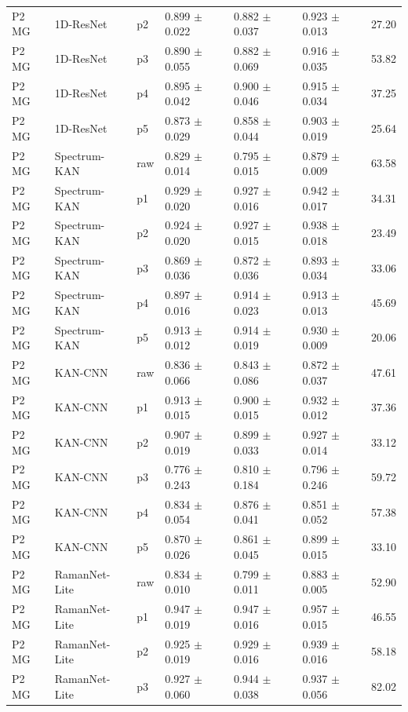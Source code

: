 {\begin{longtable}{L{2.35cm}L{2.4cm}L{1.0cm}L{2.35cm}L{2.25cm}L{2.25cm}L{1.45cm}}
P2 MG & 1D-ResNet & p2 & 0.899 $\pm$ 0.022 & 0.882 $\pm$ 0.037 & 0.923 $\pm$ 0.013 & 27.20 \\
P2 MG & 1D-ResNet & p3 & 0.890 $\pm$ 0.055 & 0.882 $\pm$ 0.069 & 0.916 $\pm$ 0.035 & 53.82 \\
P2 MG & 1D-ResNet & p4 & 0.895 $\pm$ 0.042 & 0.900 $\pm$ 0.046 & 0.915 $\pm$ 0.034 & 37.25 \\
P2 MG & 1D-ResNet & p5 & 0.873 $\pm$ 0.029 & 0.858 $\pm$ 0.044 & 0.903 $\pm$ 0.019 & 25.64 \\
P2 MG & Spectrum-KAN & raw & 0.829 $\pm$ 0.014 & 0.795 $\pm$ 0.015 & 0.879 $\pm$ 0.009 & 63.58 \\
P2 MG & Spectrum-KAN & p1 & 0.929 $\pm$ 0.020 & 0.927 $\pm$ 0.016 & 0.942 $\pm$ 0.017 & 34.31 \\
P2 MG & Spectrum-KAN & p2 & 0.924 $\pm$ 0.020 & 0.927 $\pm$ 0.015 & 0.938 $\pm$ 0.018 & 23.49 \\
P2 MG & Spectrum-KAN & p3 & 0.869 $\pm$ 0.036 & 0.872 $\pm$ 0.036 & 0.893 $\pm$ 0.034 & 33.06 \\
P2 MG & Spectrum-KAN & p4 & 0.897 $\pm$ 0.016 & 0.914 $\pm$ 0.023 & 0.913 $\pm$ 0.013 & 45.69 \\
P2 MG & Spectrum-KAN & p5 & 0.913 $\pm$ 0.012 & 0.914 $\pm$ 0.019 & 0.930 $\pm$ 0.009 & 20.06 \\
P2 MG & KAN-CNN & raw & 0.836 $\pm$ 0.066 & 0.843 $\pm$ 0.086 & 0.872 $\pm$ 0.037 & 47.61 \\
P2 MG & KAN-CNN & p1 & 0.913 $\pm$ 0.015 & 0.900 $\pm$ 0.015 & 0.932 $\pm$ 0.012 & 37.36 \\
P2 MG & KAN-CNN & p2 & 0.907 $\pm$ 0.019 & 0.899 $\pm$ 0.033 & 0.927 $\pm$ 0.014 & 33.12 \\
P2 MG & KAN-CNN & p3 & 0.776 $\pm$ 0.243 & 0.810 $\pm$ 0.184 & 0.796 $\pm$ 0.246 & 59.72 \\
P2 MG & KAN-CNN & p4 & 0.834 $\pm$ 0.054 & 0.876 $\pm$ 0.041 & 0.851 $\pm$ 0.052 & 57.38 \\
P2 MG & KAN-CNN & p5 & 0.870 $\pm$ 0.026 & 0.861 $\pm$ 0.045 & 0.899 $\pm$ 0.015 & 33.10 \\
P2 MG & RamanNet-Lite & raw & 0.834 $\pm$ 0.010 & 0.799 $\pm$ 0.011 & 0.883 $\pm$ 0.005 & 52.90 \\
P2 MG & RamanNet-Lite & p1 & 0.947 $\pm$ 0.019 & 0.947 $\pm$ 0.016 & 0.957 $\pm$ 0.015 & 46.55 \\
P2 MG & RamanNet-Lite & p2 & 0.925 $\pm$ 0.019 & 0.929 $\pm$ 0.016 & 0.939 $\pm$ 0.016 & 58.18 \\
P2 MG & RamanNet-Lite & p3 & 0.927 $\pm$ 0.060 & 0.944 $\pm$ 0.038 & 0.937 $\pm$ 0.056 & 82.02 \\

\end{longtable}}
